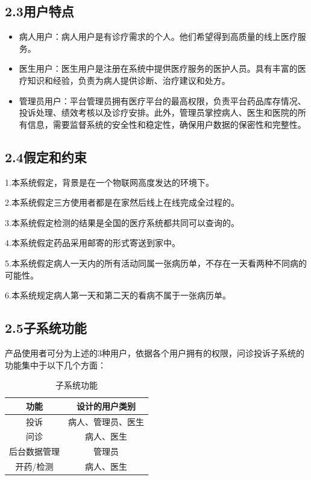 \documentclass[24pt,a4paper]{article}%
\begin{document}
\subsection*{\songti 2.3用户特点}

\begin{itemize}
	\item 病人用户：病人用户是有诊疗需求的个人。他们希望得到高质量的线上医疗服务。
	\item 医生用户：医生用户是注册在系统中提供医疗服务的医护人员。具有丰富的医疗知识和经验，负责为病人提供诊断、治疗建议和处方。
	\item 管理员用户：平台管理员拥有医疗平台的最高权限，负责平台药品库存情况、投诉处理、绩效考核以及诊疗安排。此外，管理员掌控病人、医生和医院的所有信息，需要监督系统的安全性和稳定性，确保用户数据的保密性和完整性。 
\end{itemize}

\subsection*{\songti 2.4假定和约束}
1.本系统假定，背景是在一个物联网高度发达的环境下。\par
2.本系统假定三方使用者都是在家然后线上在线完成全过程的。\par
3.本系统假定检测的结果是全国的医疗系统都共同可以查询的。\par
4.本系统假定药品采用邮寄的形式寄送到家中。\par
5.本系统假定病人一天内的所有活动同属一张病历单，不存在一天看两种不同病的可能性。\par
6.本系统规定病人第一天和第二天的看病不属于一张病历单。


\subsection*{\songti 2.5子系统功能}
产品使用者可分为上述的3种用户，依据各个用户拥有的权限，问诊投诉子系统的功能集中于以下几个方面：
\begin{table}[htpb]
	\centering
	\caption{子系统功能}
	\begin{tabular}{|c|c|}
		\hline
		功能 & 设计的用户类别\\ \hline
		投诉 & 病人、管理员、医生\\ \hline
		问诊 & 病人、医生\\ \hline
		后台数据管理 & 管理员\\ \hline
		开药/检测 & 病人、医生\\ \hline
	\end{tabular}
\end{table}
\end{document}
